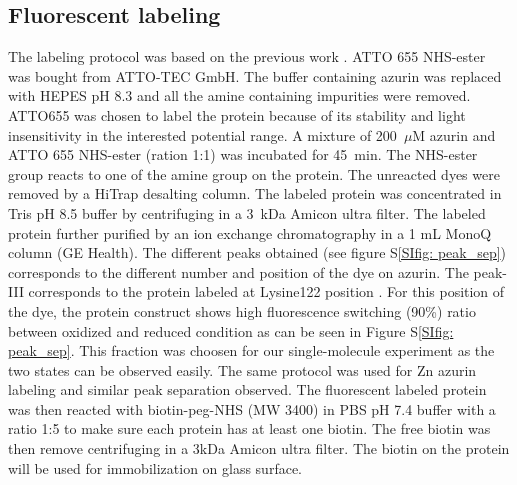 \documentclass[journal=jacsat,manuscript=article]{achemso}
\begin{document}
\subsection{Fluorescent labeling}
The labeling protocol was based on the previous work \cite{nicolardi2012topdown}. ATTO 655 NHS-ester was bought from ATTO-TEC GmbH. The buffer containing azurin was replaced with HEPES pH 8.3 and all the amine containing impurities were removed. ATTO655 was chosen to label the protein because of its stability and light insensitivity in the interested potential range. A mixture of 200~$\mu$M azurin and ATTO 655 NHS-ester (ration 1:1) was incubated for 45~min. The NHS-ester group reacts to one of the amine group on the protein. The unreacted dyes were removed by a HiTrap desalting column. The labeled protein was concentrated in Tris pH 8.5 buffer by centrifuging in a 3~kDa Amicon ultra filter. The labeled protein further purified by an ion exchange chromatography in a 1 mL MonoQ column (GE Health). The different peaks obtained (see figure S\ref{SIfig: peak_sep}) corresponds to the different number and position of the dye on azurin. The peak-III corresponds to the protein labeled at Lysine122 position \cite{nicolardi2012topdown}. For this position of the dye, the protein construct shows high fluorescence switching (90\%) ratio between oxidized and reduced condition as can be seen in Figure S\ref{SIfig: peak_sep}. This fraction was choosen for our single-molecule experiment as the two states can be observed easily. The same protocol was used for Zn azurin labeling and similar peak separation observed. The fluorescent labeled protein was then reacted with biotin-peg-NHS (MW 3400) in PBS pH 7.4 buffer with a ratio 1:5 to make sure each protein has at least one biotin. The free biotin was then remove centrifuging in a 3kDa Amicon ultra filter. The biotin on the protein will be used for immobilization on glass surface.
\end{document}
